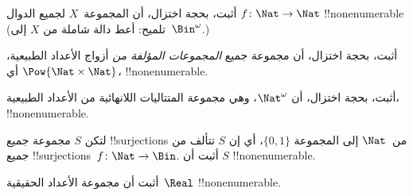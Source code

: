 \documentclass[../../../include/open-logic-section]{subfiles}
\begin{document}
\begin{prob}\label{sfr:siz:red-alt:prob:nat-nat}
  أثبت، بحجة اختزال، أن المجموعة~$X$ لجميع الدوال $f\colon \Nat \to \Nat$
  !!{nonenumerable} (تلميح: أعط دالة شاملة من $X$ إلى~$\Bin^\omega$.)
\end{prob}

\begin{prob}
أثبت، بحجة اختزال، أن مجموعة جميع \emph{المجموعات المؤلفة من} أزواج الأعداد
الطبيعية، أي $\Pow{\Nat \times \Nat}$، !!{nonenumerable}.
\end{prob}

\begin{prob}
أثبت، بحجة اختزال، أن $\Nat^\omega$، وهي مجموعة المتتاليات اللانهائية
من الأعداد الطبيعية، !!{nonenumerable}.
\end{prob}


\begin{prob}
لتكن $S$ مجموعة جميع !!{surjection}s من~$\Nat$ إلى المجموعة
$\{0,1\}$، أي إن $S$ تتألف من جميع !!{surjection}s~$f \colon \Nat
\to \Bin$. أثبت أن $S$ !!{nonenumerable}.
\end{prob}

\begin{prob}
أثبت أن مجموعة الأعداد الحقيقية~$\Real$ !!{nonenumerable}.
\end{prob}
\end{document}
